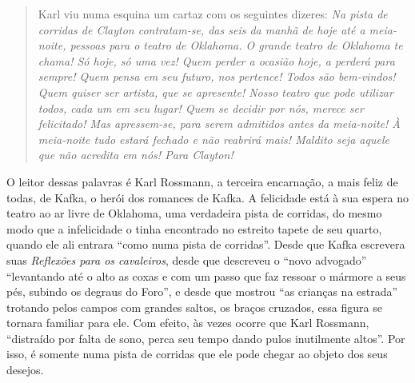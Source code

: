 
\begin{quote}
Karl viu numa
esquina um cartaz com os seguintes dizeres: \textit{Na pista de corridas de
Clayton contratam-se, das seis da manhã de hoje até a meia-noite,
pessoas para o teatro de Oklahoma. O grande teatro de Oklahoma te chama!
Só hoje, só uma vez! Quem perder a ocasião hoje, a perderá para sempre!
Quem pensa em seu futuro, nos pertence! Todos são bem-vindos! Quem
quiser ser artista, que se apresente! Nosso teatro que pode utilizar
todos, cada um em seu lugar! Quem se decidir por nós, merece ser
felicitado! Mas apressem-se, para serem admitidos antes da meia-noite! À
meia-noite tudo estará fechado e não reabrirá mais! Maldito seja aquele
que não acredita em nós! Para Clayton!} 
\end{quote}

O leitor dessas palavras é
Karl Rossmann, a terceira encarnação, a mais feliz de todas, de Kafka, o
herói dos romances de Kafka. A felicidade está à sua espera no teatro ao
ar livre de Oklahoma, uma verdadeira pista de corridas, do mesmo modo
que a infelicidade o tinha encontrado no estreito tapete de seu quarto,
quando ele ali entrara ``como numa pista de corridas''. Desde que Kafka
escrevera suas \textit{Reflexões para os cavaleiros}, desde que descreveu o
``novo advogado'' ``levantando até o alto as coxas e com um passo que
faz ressoar o mármore a seus pés, subindo os degraus do Foro'', e desde
que mostrou ``as crianças na estrada'' trotando pelos campos com grandes
saltos, os braços cruzados, essa figura se tornara familiar para ele.
Com efeito, às vezes ocorre que Karl Rossmann, ``distraído por falta de
sono, perca seu tempo dando pulos inutilmente altos''. Por isso, é
somente numa pista de corridas que ele pode chegar ao objeto dos seus
desejos.

